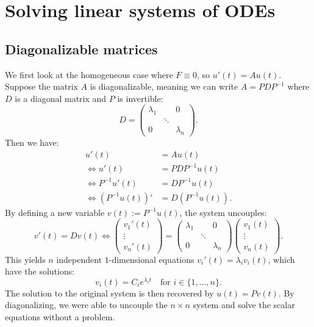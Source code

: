 \section{Solving linear systems of ODEs}
\label{sec:solving_linear_systems_odes}

\subsection{Diagonalizable matrices}
We first look at the homogeneous case where $F \equiv 0$, so $u'(t) = A u(t)$.
Suppose the matrix $A$ is diagonalizable, meaning we can write $A = P D P^{-1}$ where $D$ is a diagonal matrix and $P$ is invertible:
\[D = \begin{pmatrix} \lambda_1 & & 0 \\ & \ddots & \\ 0 & & \lambda_n \end{pmatrix}.\]
Then we have:
\begin{align*}
    u'(t) &= A u(t) \\
    \iff u'(t) &= P D P^{-1} u(t) \\
    \iff P^{-1} u'(t) &= D P^{-1} u(t) \\
    \iff (P^{-1} u(t))' &= D (P^{-1} u(t)).
\end{align*}
By defining a new variable $v(t) := P^{-1} u(t)$, the system uncouples:
\[v'(t) = D v(t) \iff \begin{pmatrix} v_1'(t) \\ \vdots \\ v_n'(t) \end{pmatrix} = \begin{pmatrix} \lambda_1 & & 0 \\ & \ddots & \\ 0 & & \lambda_n \end{pmatrix} \begin{pmatrix} v_1(t) \\ \vdots \\ v_n(t) \end{pmatrix}.\]
This yields $n$ independent $1$-dimensional equations $v_i'(t) = \lambda_i v_i(t)$, which have the solutions:
\[v_i(t) = C_i e^{\lambda_i t} \quad \text{for } i \in \{1,\dots,n\}.\]
The solution to the original system is then recovered by $u(t) = P v(t)$. By diagonalizing, we were able to uncouple the $n \times n$ system and solve the scalar equations without a problem.

